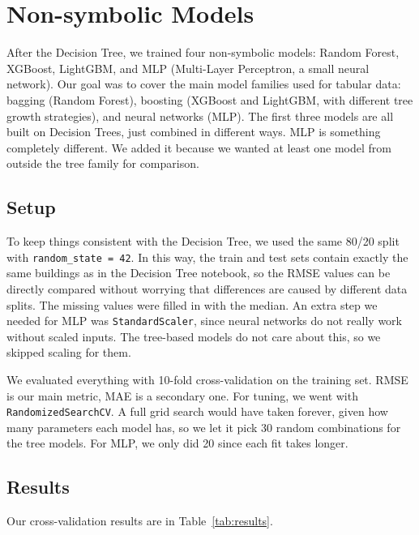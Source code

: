 \documentclass[11pt,a4paper]{article}
\begin{document}
 
\section{Non-symbolic Models}
 
After the Decision Tree, we trained four non-symbolic models: Random Forest, XGBoost, LightGBM, and MLP (Multi-Layer Perceptron, a small neural network). Our goal was to cover the main model families used for tabular data: bagging (Random Forest), boosting (XGBoost and LightGBM, with different tree growth strategies), and neural networks (MLP). The first three models are all built on Decision Trees, just combined in different ways. MLP is something completely different. We added it because we wanted at least one model from outside the tree family for comparison.
 
\subsection{Setup}
 
To keep things consistent with the Decision Tree, we used the same 80/20 split with \texttt{random\_state = 42}. In this way, the train and test sets contain exactly the same buildings as in the Decision Tree notebook, so the RMSE values can be directly compared without worrying that differences are caused by different data splits. The missing values were filled in with the median. An extra step we needed for MLP was \texttt{StandardScaler}, since neural networks do not really work without scaled inputs. The tree-based models do not care about this, so we skipped scaling for them.

We evaluated everything with 10-fold cross-validation on the training set. RMSE is our main metric, MAE is a secondary one. For tuning, we went with \texttt{RandomizedSearchCV}. A full grid search would have taken forever, given how many parameters each model has, so we let it pick 30 random combinations for the tree models. For MLP, we only did 20 since each fit takes longer.
 
\subsection{Results}
 
Our cross-validation results are in Table~\ref{tab:results}.
 
\end{document}
